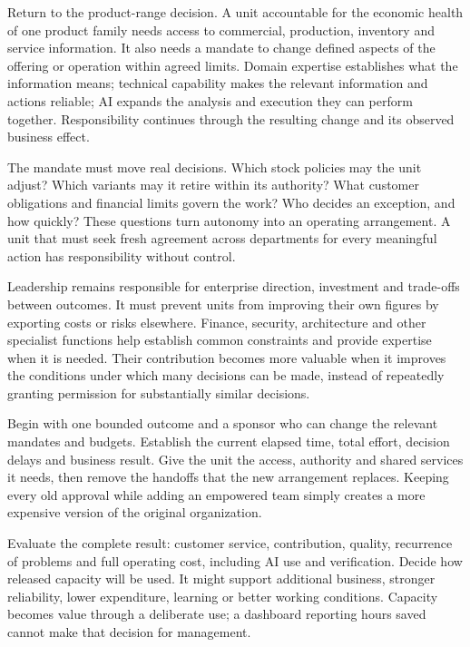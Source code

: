 \begin{EssayColumns}
Return to the product-range decision. A unit accountable for the
economic health of one product family needs access to commercial,
production, inventory and service information. It also needs a mandate
to change defined aspects of the offering or operation within agreed
limits. Domain expertise establishes what the information means;
technical capability makes the relevant information and actions
reliable; AI expands the analysis and execution they can perform
together. Responsibility continues through the resulting change and its
observed business effect.

\wrapstuffclear\end{EssayColumns}

\clearpage

\begin{EssayColumns}

The mandate must move real decisions. Which stock policies may the unit
adjust? Which variants may it retire within its authority? What customer
obligations and financial limits govern the work? Who decides an
exception, and how quickly? These questions turn autonomy into an
operating arrangement. A unit that must seek fresh agreement across
departments for every meaningful action has responsibility without
control.

Leadership remains responsible for enterprise direction, investment and
trade-offs between outcomes. It must prevent units from improving their
own figures by exporting costs or risks elsewhere. Finance, security,
architecture and other specialist functions help establish common
constraints and provide expertise when it is needed. Their contribution
becomes more valuable when it improves the conditions under which many
decisions can be made, instead of repeatedly granting permission for
substantially similar decisions.

\NextEssayColumn

Begin with one bounded outcome and a sponsor who can change the relevant
mandates and budgets. Establish the current elapsed time, total effort,
decision delays and business result. Give the unit the access, authority
and shared services it needs, then remove the handoffs that the new
arrangement replaces. Keeping every old approval while adding an
empowered team simply creates a more expensive version of the original
organization.

Evaluate the complete result: customer service, contribution, quality,
recurrence of problems and full operating cost, including AI use and
verification. Decide how released capacity will be used. It might
support additional business, stronger reliability, lower expenditure,
learning or better working conditions. Capacity becomes value through a
deliberate use; a dashboard reporting hours saved cannot make that
decision for management.


\end{EssayColumns}
